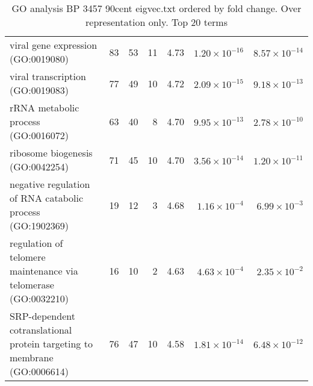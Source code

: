 \begin{table}[ht]
\begin{adjustbox}{width=\textwidth}
\begin{tabular}{lrrrlrr}
  viral gene expression (GO:0019080) & 83 & 53 & 11 & 4.73 & $1.20 \times 10^{-16}$ & $8.57 \times 10^{-14}$ \\ 
  viral transcription (GO:0019083) & 77 & 49 & 10 & 4.72 & $2.09 \times 10^{-15}$ & $9.18 \times 10^{-13}$ \\ 
  rRNA metabolic process (GO:0016072) & 63 & 40 & 8 & 4.70 & $9.95 \times 10^{-13}$ & $2.78 \times 10^{-10}$ \\ 
  ribosome biogenesis (GO:0042254) & 71 & 45 & 10 & 4.70 & $3.56 \times 10^{-14}$ & $1.20 \times 10^{-11}$ \\ 
  negative regulation of RNA catabolic process (GO:1902369) & 19 & 12 & 3 & 4.68 & $1.16 \times 10^{-4}$ & $6.99 \times 10^{-3}$ \\ 
  regulation of telomere maintenance via telomerase (GO:0032210) & 16 & 10 & 2 & 4.63 & $4.63 \times 10^{-4}$ & $2.35 \times 10^{-2}$ \\ 
  SRP-dependent cotranslational protein targeting to membrane (GO:0006614) & 76 & 47 & 10 & 4.58 & $1.81 \times 10^{-14}$ & $6.48 \times 10^{-12}$ \\ 
   \hline
\end{tabular}
\end{adjustbox}
\caption{GO analysis BP 3457 90cent eigvec.txt ordered by fold change. Over representation only. Top 20 terms} 
\label{tab:GO analysis BP 3457 90cent eigvec.txt ordered by fold change. Over representation only. Top 20 terms}
\end{table}



